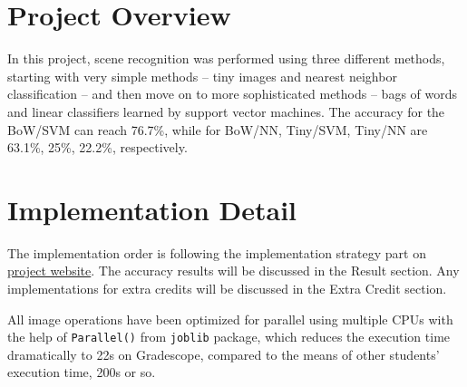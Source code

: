 
\section*{Project Overview}

In this project, scene recognition was performed using three different methods, starting with very simple methods -- tiny images and nearest neighbor classification -- and then move on to more sophisticated methods -- bags of words and linear classifiers learned by support vector machines. The accuracy for the BoW/SVM can reach 76.7\%, while for BoW/NN, Tiny/SVM, Tiny/NN are 63.1\%, 25\%, 22.2\%, respectively.

\section*{Implementation Detail}

The implementation order is following the implementation strategy part on \hyperlink{https://browncsci1430.github.io/webpage/proj3_scenerecognition/}{project website}. The accuracy results will be discussed in the Result section. Any implementations for extra credits will be discussed in the Extra Credit section.

All image operations have been optimized for parallel using multiple CPUs with the help of \verb|Parallel()| from \verb|joblib| package, which reduces the execution time dramatically to 22s on Gradescope, compared to the means of other students' execution time, 200s or so.

